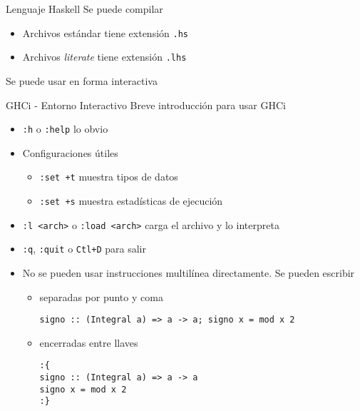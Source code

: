 \begin{frame}[fragile]{Lenguaje Haskell}
    Se puede compilar
    \begin{itemize}
        \item Archivos estándar tiene extensión \verb|.hs|
        \item Archivos \emph{literate} tiene extensión \verb|.lhs|
    \end{itemize}
    Se puede usar en forma interactiva
\end{frame}


\begin{frame}[fragile]{GHCi - Entorno Interactivo}
    Breve introducción para usar GHCi
    \begin{itemize}
        \item \verb|:h| o \verb|:help| lo obvio
        \item Configuraciones útiles
        \begin{itemize}
            \item \verb|:set +t| muestra tipos de datos
            \item \verb|:set +s| muestra estadísticas de ejecución
        \end{itemize}
        \item \verb|:l <arch>| o \verb|:load <arch>| carga el archivo y lo interpreta
        \item \verb|:q|, \verb|:quit| o \verb|Ctl+D| para salir
        \item No se pueden usar instrucciones multilínea directamente. Se pueden escribir
        \begin{itemize}
            \item separadas por punto y coma
            \begin{lstlisting}[style=consola]
signo :: (Integral a) => a -> a; signo x = mod x 2
            \end{lstlisting}
            \item encerradas entre llaves
            \begin{lstlisting}[style=consola]
:{
signo :: (Integral a) => a -> a
signo x = mod x 2
:}
            \end{lstlisting}
        \end{itemize}
    \end{itemize}
\end{frame}

